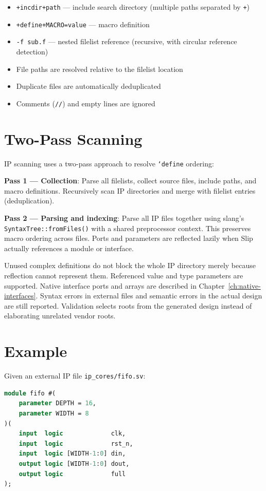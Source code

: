 \documentclass[lang=en,11pt]{elegantbook}
\newcommand{\code}[1]{\texttt{#1}}
\begin{document}
\begin{itemize}
  \item \code{+incdir+path} --- include search directory (multiple paths separated by \code{+})
  \item \code{+define+MACRO=value} --- macro definition
  \item \code{-f sub.f} --- nested filelist reference (recursive, with circular reference detection)
  \item File paths are resolved relative to the filelist location
  \item Duplicate files are automatically deduplicated
  \item Comments (\code{//}) and empty lines are ignored
\end{itemize}

\section{Two-Pass Scanning}

IP scanning uses a two-pass approach to resolve \code{`define} ordering:

\textbf{Pass 1 --- Collection}: Parse all filelists, collect source files, include paths, and macro definitions. Recursively scan IP directories and merge with filelist entries (deduplication).

\textbf{Pass 2 --- Parsing and indexing}: Parse all IP files together using
slang's \code{SyntaxTree::fromFiles()} with a shared preprocessor context.
This preserves macro ordering across files. Ports and parameters are reflected
lazily when Slip actually references a module or interface.

Unused complex definitions do not block the whole IP directory merely because
reflection cannot represent them. Referenced value and type parameters are
supported. Native interface ports and arrays are
described in Chapter~\ref{ch:native-interfaces}. Syntax errors in external files
and semantic errors in the actual design are still reported. Validation selects
roots from the generated design instead of elaborating unrelated vendor roots.

\section{Example}

Given an external IP file \code{ip\_cores/fifo.sv}:

\begin{lstlisting}[language=SystemVerilog]
module fifo #(
    parameter DEPTH = 16,
    parameter WIDTH = 8
)(
    input  logic             clk,
    input  logic             rst_n,
    input  logic [WIDTH-1:0] din,
    output logic [WIDTH-1:0] dout,
    output logic             full
);
\end{lstlisting}
\end{document}
